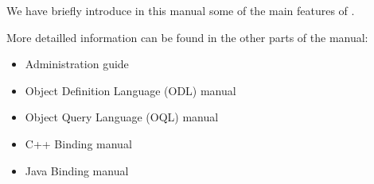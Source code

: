 
We have briefly introduce in this manual some of the main features
of \eyedbX.

More detailled information can be found in the other parts of the \eyedb manual:
\begin{itemize}
\item Administration guide
\item Object Definition Language (ODL) manual
\item Object Query Language (OQL) manual
\item C++ Binding manual
\item Java Binding manual
\end{itemize}





